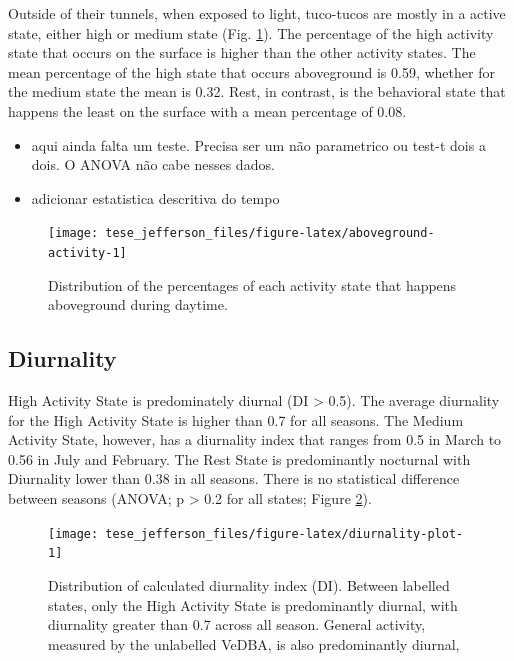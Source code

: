 \documentclass[msc,numbers,hidelinks]{coppe}
\providecommand{\tightlist}{
  \setlength{\itemsep}{0pt}\setlength{\parskip}{0pt}}
\begin{document}
  Outside of their tunnels, when exposed to light, tuco-tucos are mostly in a active state, either high or medium state (Fig. \ref{fig:aboveground-activity}). The percentage of the high activity state that occurs on the surface is higher than the other activity states. The mean percentage of the high state that occurs aboveground is 0.59, whether for the medium state the mean is 0.32. Rest, in contrast, is the behavioral state that happens the least on the surface with a mean percentage of 0.08.\newline
  \begin{itemize}
  \tightlist
  \item
    aqui ainda falta um teste. Precisa ser um não parametrico ou test-t dois a dois. O ANOVA não cabe nesses dados.
  \item
    adicionar estatistica descritiva do tempo
  \end{itemize}
  \begin{figure}[H]

  {\centering \texttt{[image: tese\_jefferson\_files/figure-latex/aboveground-activity-1]} 

  }

  \caption{Distribution of the percentages of each activity state that happens aboveground during daytime.}\label{fig:aboveground-activity}
  \end{figure}
  \newpage

  \hypertarget{diurnality}{%
  \subsection{Diurnality}\label{diurnality}}

  High Activity State is predominately diurnal (DI \textgreater{} 0.5). The average diurnality for the High Activity State is higher than 0.7 for all seasons. The Medium Activity State, however, has a diurnality index that ranges from 0.5 in March to 0.56 in July and February. The Rest State is predominantly nocturnal with Diurnality lower than 0.38 in all seasons. There is no statistical difference between seasons (ANOVA; p \textgreater{} 0.2 for all states; Figure \ref{fig:diurnality-plot}). \newline
  \begin{figure}[H]

  {\centering \texttt{[image: tese\_jefferson\_files/figure-latex/diurnality-plot-1]} 

  }

  \caption{Distribution of calculated diurnality index (DI). Between labelled states, only the High Activity State is predominantly diurnal, with diurnality greater than 0.7 across all season. General activity, measured by the unlabelled VeDBA, is also predominantly diurnal, }\label{fig:diurnality-plot}
  \end{figure}
  \newpage
\end{document}
